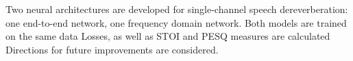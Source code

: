 \small{
Two neural architectures are developed for single-channel speech dereverberation: one end-to-end network, one frequency domain network.
Both models are trained on the same data
Losses, as well as \ac{STOI} and \ac{PESQ} measures are calculated
Directions for future improvements are considered.
}
